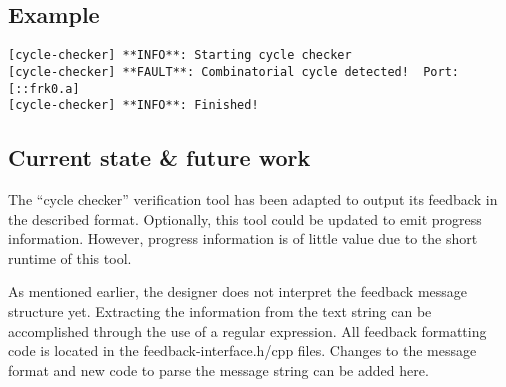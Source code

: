 \subsection{Example}

\begin{verbatim}
[cycle-checker] **INFO**: Starting cycle checker
[cycle-checker] **FAULT**: Combinatorial cycle detected!  Port: [::frk0.a]
[cycle-checker] **INFO**: Finished! 
\end{verbatim}


\subsection{Current state \& future work}

The ``cycle checker'' verification tool has been adapted to output its feedback in the
described format. Optionally, this tool could be updated to emit progress information.
However, progress information is of little value due to the short runtime of this tool.

As mentioned earlier, the designer does not interpret the feedback message structure yet.
Extracting the information from the text string can be accomplished through the use of a
regular expression. All feedback formatting code is located in the feedback-interface.h/cpp
files. Changes to the message format and new code to parse the message string can be added
here.